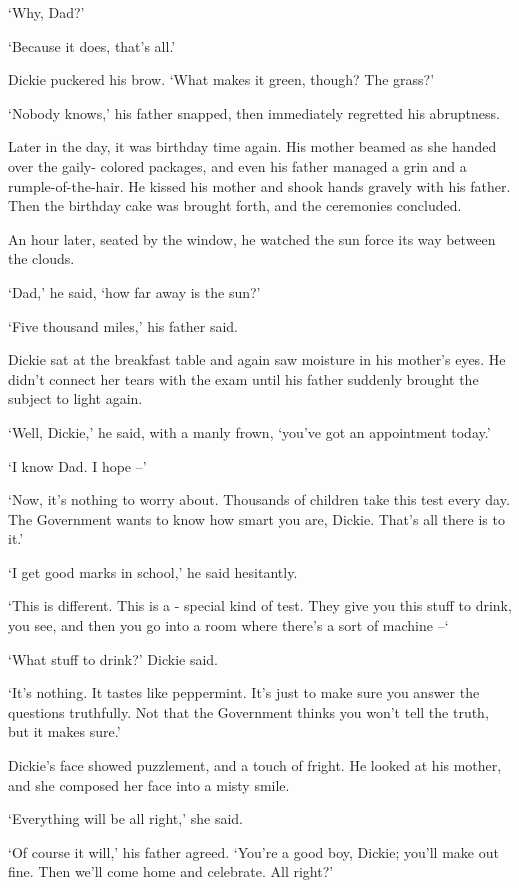 \documentclass[10pt,a4paper]{article}
\begin{document}
‘Why, Dad?’

‘Because it does, that’s all.’

Dickie puckered his brow. ‘What makes it green, though? The grass?’

‘Nobody knows,’ his father snapped, then immediately regretted his abruptness.

Later in the day, it was birthday time again. His mother beamed as she handed over the gaily- colored packages, and even his father managed a grin and a rumple-of-the-hair. He kissed his mother and shook hands gravely with his father. Then the birthday cake was brought forth, and the ceremonies concluded.

An hour later, seated by the window, he watched the sun force its way between the clouds.

‘Dad,’ he said, ‘how far away is the sun?’

‘Five thousand miles,’ his father said.

Dickie sat at the breakfast table and again saw moisture in his mother’s eyes. He didn’t connect her tears with the exam until his father suddenly brought the subject to light again.
 
‘Well, Dickie,’ he said, with a manly frown, ‘you’ve got an appointment today.’

‘I know Dad. I hope –’

‘Now, it’s nothing to worry about. Thousands of children take this test every day. The Government wants to know how smart you are, Dickie. That’s all there is to it.’

‘I get good marks in school,’ he said hesitantly.

‘This is different. This is a - special kind of test. They give you this stuff to drink, you see, and then you go into a room where there’s a sort of machine –‘

‘What stuff to drink?’ Dickie said.

‘It’s nothing. It tastes like peppermint. It’s just to make sure you answer the questions truthfully. Not that the Government thinks you won’t tell the truth, but it makes sure.’

Dickie’s face showed puzzlement, and a touch of fright. He looked at his mother, and she composed her face into a misty smile.

‘Everything will be all right,’ she said.

‘Of course it will,’ his father agreed. ‘You’re a good boy, Dickie; you’ll make out fine. Then we’ll come home and celebrate. All right?’
\end{document}
